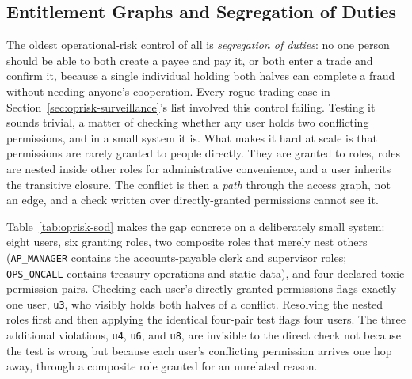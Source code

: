 \documentclass[../ai_in_finance]{subfiles}
\begin{document}
\subsection{Entitlement Graphs and Segregation of Duties}
\label{sec:oprisk-entitlements}

The oldest operational-risk control of all is \emph{segregation of duties}: no one person should be able to both create a payee and pay it, or both enter a trade and confirm it, because a single individual holding both halves can complete a fraud without needing anyone's cooperation. Every rogue-trading case in Section~\ref{sec:oprisk-surveillance}'s list involved this control failing. Testing it sounds trivial, a matter of checking whether any user holds two conflicting permissions, and in a small system it is. What makes it hard at scale is that permissions are rarely granted to people directly. They are granted to roles, roles are nested inside other roles for administrative convenience, and a user inherits the transitive closure. The conflict is then a \emph{path} through the access graph, not an edge, and a check written over directly-granted permissions cannot see it.

Table~\ref{tab:oprisk-sod} makes the gap concrete on a deliberately small system: eight users, six granting roles, two composite roles that merely nest others (\texttt{AP\_MANAGER} contains the accounts-payable clerk and supervisor roles; \texttt{OPS\_ONCALL} contains treasury operations and static data), and four declared toxic permission pairs. Checking each user's directly-granted permissions flags exactly one user, \texttt{u3}, who visibly holds both halves of a conflict. Resolving the nested roles first and then applying the identical four-pair test flags four users. The three additional violations, \texttt{u4}, \texttt{u6}, and \texttt{u8}, are invisible to the direct check not because the test is wrong but because each user's conflicting permission arrives one hop away, through a composite role granted for an unrelated reason.
\end{document}
